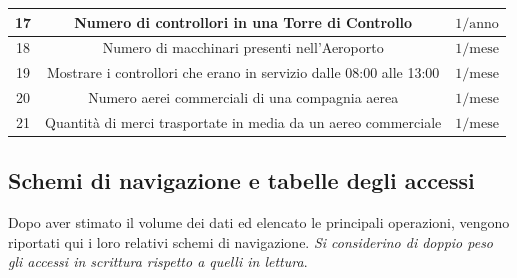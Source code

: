 \begin{tabular}{ | c c c |}
	\hline
	\textsf{\small 17} & \textsf{\small Numero di controllori in una Torre di Controllo} & \textsf{\small $ 1 / \text{anno} $} \\
	\hline
	\textsf{\small 18} & \textsf{\small Numero di macchinari presenti nell'Aeroporto} & \textsf{\small $ 1 / \text{mese} $} \\
	\hline
	\textsf{\small 19} & \textsf{\small Mostrare i controllori che erano in servizio dalle 08:00 alle 13:00} & \textsf{\small $ 1 / \text{mese} $} \\
	\hline
	\textsf{\small 20} & \textsf{\small Numero aerei commerciali di una compagnia aerea} & \textsf{\small $ 1/ \text{mese} $} \\
	\hline
	\textsf{\small 21} & \textsf{\small Quantità di merci trasportate in media da un aereo commerciale} & \textsf{\small $ 1/ \text{mese} $} \\
	\hline
\end{tabular}



\newpage

\enlargethispage{1\linewidth}

\subsection{Schemi di navigazione e tabelle degli accessi}

\textsf{\small Dopo aver stimato il volume dei dati ed elencato le principali operazioni, vengono riportati qui i loro relativi schemi di navigazione. \emph{Si considerino di doppio peso gli accessi in scrittura rispetto a quelli in lettura}.}\break






